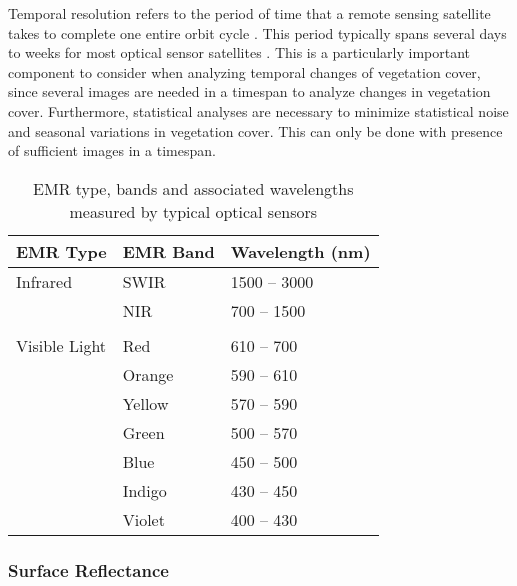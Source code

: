 \justify
Temporal resolution refers to the period of time that a remote sensing satellite takes to complete one entire orbit cycle \citep{lwin2008}. This period typically spans several days to weeks for most optical sensor satellites \citep{lwin2008}. This is a particularly important component to consider when analyzing temporal changes of vegetation cover, since several images are needed in a timespan to analyze changes in vegetation cover. Furthermore, statistical analyses are necessary to minimize statistical noise and seasonal variations in vegetation cover. This can only be done with presence of sufficient images in a timespan. 

\vspace{4pt}
\begin{table}[H]
	\centering
	\small
	\def\arraystretch{1.3}
	\begin{threeparttable}
		\caption{EMR type, bands and associated wavelengths measured by typical optical sensors }
		\label{table4}
		\begin{tabular}{L{5.2cm} L{5cm} L{4.1cm}}
			\toprule[0.25mm]
			EMR Type & EMR Band & Wavelength (nm)\\
			\midrule[0.35mm]
			Infrared   & SWIR    & 1500 – 3000 \\
			& NIR   & 700 – 1500 \\\\[-0.3cm]
			Visible Light   & Red   & 610 – 700\\
			& Orange & 590 – 610 \\
			& Yellow   & 570 – 590 \\
			& Green   & 500 – 570 \\
			& Blue   & 450 – 500 \\
			& Indigo   & 430 – 450 \\
			& Violet   & 400 – 430 \\
			\bottomrule[0.25mm]
		\end{tabular}
	\end{threeparttable}
\end{table}

\subsubsection{Surface Reflectance}

